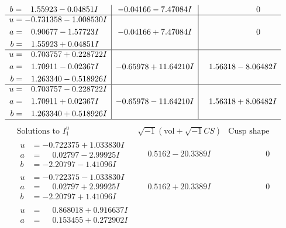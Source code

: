 \documentclass[1p]{elsarticle_modified}
\theoremstyle{definition}
\newcommand{\I}{\sqrt{-1}}
\begin{document}
$$\begin{array}{c|c|c}
\begin{aligned}
b &= \phantom{-}1.55923 - 0.04851 I\end{aligned}
 & -0.04166 - 7.47084 I & \phantom{-0.000000 } 0 \\ \hline\begin{aligned}
u &= -0.731358 - 1.008530 I \\
a &= \phantom{-}0.90677 - 1.57723 I \\
b &= \phantom{-}1.55923 + 0.04851 I\end{aligned}
 & -0.04166 + 7.47084 I & \phantom{-0.000000 } 0 \\ \hline\begin{aligned}
u &= \phantom{-}0.703757 + 0.228722 I \\
a &= \phantom{-}1.70911 - 0.02367 I \\
b &= \phantom{-}1.263340 - 0.518926 I\end{aligned}
 & -0.65978 + 11.64210 I & \phantom{-}1.56318 - 8.06482 I \\ \hline\begin{aligned}
u &= \phantom{-}0.703757 - 0.228722 I \\
a &= \phantom{-}1.70911 + 0.02367 I \\
b &= \phantom{-}1.263340 + 0.518926 I\end{aligned}
 & -0.65978 - 11.64210 I & \phantom{-}1.56318 + 8.06482 I\\
 \hline 
 \end{array}$$\newpage$$\begin{array}{c|c|c}  
\text{Solutions to }I^u_{1}& \I (\text{vol} + \sqrt{-1}CS) & \text{Cusp shape}\\
 \hline 
\begin{aligned}
u &= -0.722375 + 1.033830 I \\
a &= \phantom{-}0.02797 - 2.99925 I \\
b &= -2.20797 - 1.41096 I\end{aligned}
 & \phantom{-}0.5162 - 20.3389 I & \phantom{-0.000000 } 0 \\ \hline\begin{aligned}
u &= -0.722375 - 1.033830 I \\
a &= \phantom{-}0.02797 + 2.99925 I \\
b &= -2.20797 + 1.41096 I\end{aligned}
 & \phantom{-}0.5162 + 20.3389 I & \phantom{-0.000000 } 0 \\ \hline\begin{aligned}
u &= \phantom{-}0.868018 + 0.916637 I \\
a &= \phantom{-}0.153455 + 0.272902 I \\

\end{aligned}
\end{array}$$
\end{document}
